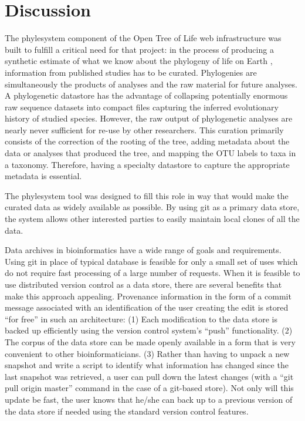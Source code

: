 \documentclass{bioinfo}
\newcommand{\ps}{phylesystem\xspace}
\newcommand{\otol}{Open Tree of Life\xspace}
\begin{document}
\section{Discussion}
The \ps component of the \otol web infrastructure was built to fulfill a critical need for that
    project: in the process of producing a synthetic estimate of what we know about the phylogeny
    of life on Earth \citep{}, information from published studies has to be curated.
Phylogenies are simultaneously the products of analyses and the raw material for future analyses.
A phylogenetic datastore has the advantage of collapsing potentially enormous raw sequence datasets
  into compact files capturing the inferred evolutionary history of studied species.
However, the raw output of phylogenetic analyses are nearly never sufficient for re-use by other researchers. 
This curation primarily consists of the correction of the rooting of the tree, adding metadata about the data
    or analyses that produced the tree, and mapping the OTU labels to taxa in a taxonomy.
Therefore, having a specialty datastore to capture the appropriate metadata is essential.

The \ps tool was designed to fill this role in way that would make the curated data as widely available
    as possible.
By using git as a primary data store, the system allows other interested parties to easily maintain
    local clones of all the data.

Data archives in bioinformatics have a wide range of goals and requirements.
Using git in place of typical database is feasible for only a small set of uses which do not require
    fast processing of a large number of requests.
When it is feasible to use distributed version control as a data store, there are several benefits
    that make this approach appealing.
Provenance information in the form of a commit message associated with an identification of the 
    user creating the edit is stored ``for free'' in such an architecture:
(1) Each modification to the data store is backed up efficiently using the version control system's ``push'' functionality.
(2) The corpus of the data store can be made openly available in a form that is very convenient to
    other bioinformaticians.
(3) Rather than having to unpack a new snapshot and write a script to identify
    what information has changed since the last snapshot was retrieved, a user can pull down
    the latest changes (with a ``git pull origin master'' command in the case of a git-based store).
Not only will this update be fast, the user knows that he/she can back up to a previous version of the 
    data store if needed using the standard version control features.
\end{document}
